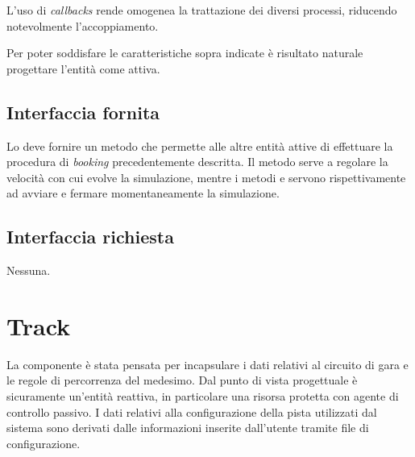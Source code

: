 L'uso di \textit{callbacks} rende omogenea la trattazione dei diversi processi, riducendo notevolmente l'accoppiamento.

Per poter soddisfare le caratteristiche sopra indicate è risultato naturale progettare l'entità \sched{} come attiva.

\subsection*{Interfaccia fornita}
Lo \sched{} deve fornire un metodo  che permette alle altre entità attive di effettuare la procedura di \textit{booking} precedentemente descritta.
Il metodo  serve a regolare la velocità con cui evolve la simulazione, mentre i metodi  e  servono rispettivamente ad avviare e fermare momentaneamente la simulazione.

\subsection*{Interfaccia richiesta}
Nessuna.

\section{Track}
La componente \track{} è stata pensata per incapsulare i dati relativi al circuito di gara e le regole di percorrenza del medesimo. Dal punto di vista progettuale \track{} è sicuramente un'entità reattiva, in particolare una risorsa protetta con agente di controllo passivo.
I dati relativi alla configurazione della pista utilizzati dal sistema sono derivati dalle informazioni inserite dall'utente tramite file di configurazione.

